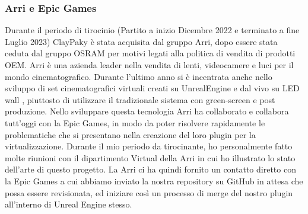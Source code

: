 \documentclass[main.tex]{subfiles}
\begin{document}
\subsubsection{Arri e Epic Games}\label{subsec:6_1_Arri-EG}
Durante il periodo di tirocinio (Partito a inizio Dicembre 2022 e terminato a fine Luglio 2023) ClayPaky è stata acquisita dal gruppo Arri, dopo essere stata ceduta dal gruppo OSRAM per motivi legati alla politica di vendita di prodotti OEM. Arri è una azienda leader nella vendita di lenti, videocamere e luci per il mondo cinematografico. Durante l'ultimo anno si è incentrata anche nello sviluppo di set cinematografici virtuali creati su UnrealEngine e  dal vivo su LED wall \cite{virtualProduction}, piuttosto di utilizzare il tradizionale sistema con green-screen e post produzione. Nello sviluppare questa tecnologia Arri ha collaborato e collabora tutt'oggi con la Epic Games, in modo da poter risolvere rapidamente le problematiche che si presentano nella creazione del loro plugin per la virtualizzazione. Durante il mio periodo da tirocinante, ho personalmente fatto molte riunioni con il dipartimento Virtual della Arri in cui ho illustrato lo stato dell'arte di questo progetto. La Arri ci ha quindi fornito un contatto diretto con la Epic Games a cui abbiamo inviato la nostra repository su GitHub \cite{gdtfImporterPlugin} in attesa che possa essere revisionata, ed iniziare così un processo di merge del nostro plugin all'interno di Unreal Engine stesso.

\clearpage
\end{document}
